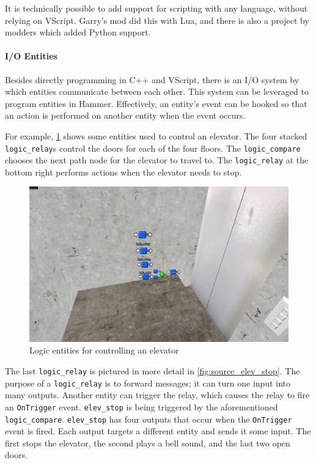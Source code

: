 \documentclass[a4paper, 12pt]{scrartcl}
\begin{document}
It is technically possible to add support for scripting with any language, without relying on VScript. Garry's mod did this with Lua, and there is also a project by modders which added Python support.

\paragraph{I/O Entities}
Besides directly programming in C++ and VScript, there is an I/O system by which entities communicate between each other. This system can be leveraged to program entities in Hammer. Effectively, an entity's event can be hooked so that an action is performed on another entity when the event occurs.

For example, \cref{fig:source_entities} shows some entities used to control an elevator. The four stacked \texttt{logic\_relay}s control the doors for each of the four floors. The \texttt{logic\_compare} chooses the next path node for the elevator to travel to. The \texttt{logic\_relay} at the bottom right performs actions when the elevator needs to stop.

\begin{figure}[!htb]
  \centering
  \includegraphics[width=0.75\linewidth]{images/source_io_entities.png}
  \caption{Logic entities for controlling an elevator}
  \label{fig:source_entities}
\end{figure}

The last \texttt{logic\_relay} is pictured in more detail in \cref{fig:source_elev_stop}. The purpose of a \texttt{logic\_relay} is to forward messages; it can turn one input into many outputs. Another entity can trigger the relay, which causes the relay to fire an \texttt{OnTrigger} event. \texttt{elev\_stop} is being triggered by the aforementioned \texttt{logic\_compare}. \texttt{elev\_stop} has four outputs that occur when the \texttt{OnTrigger} event is fired. Each output targets a different entity and sends it some input. The first stops the elevator, the second plays a bell sound, and the last two open doors.
\end{document}
